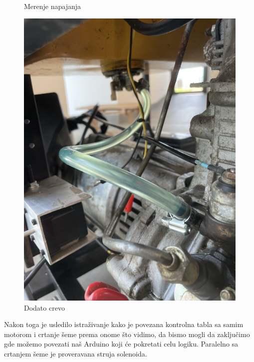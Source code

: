 \documentclass[a4paper, 11pt, titlepage]{article}
\begin{document}
\begin{figure}[htbp]
\begin{minipage}[b]{0.3\textwidth}
    \caption{Merenje napajanja}
  \end{minipage}
    \hfill
  \begin{minipage}[b]{0.3\textwidth}
    \centering
    \includegraphics[angle = 270, width=0.75\linewidth]{IMG_4727.jpeg}
    \caption{Dodato crevo}
  \end{minipage}
\end{figure}


Nakon toga je usledilo istraživanje kako je povezana kontrolna tabla sa samim motorom i crtanje šeme prema onome što vidimo, da bismo mogli da zaključimo gde možemo povezati naš Arduino koji će pokretati celu logiku. Paralelno sa crtanjem šeme je proveravana struja solenoida. \\
\end{document}
